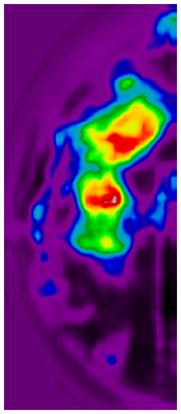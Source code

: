\begin{figure}[h!]

	\begin{subfigure}{0.195\textwidth}
		\centering
			\includegraphics[width=\textwidth]{plots/examples/example3_probs_2.png}

\end{subfigure}
\end{figure}

